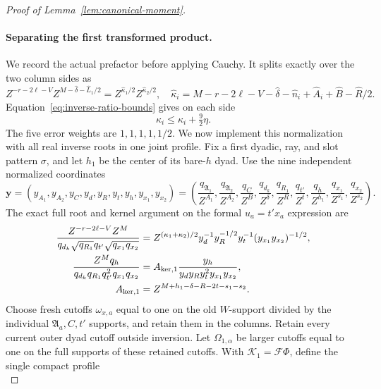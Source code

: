 \documentclass[11pt,a4paper]{article}
\numberwithin{equation}{section}
\numberwithin{figure}{section}
\theoremstyle{definition}
\theoremstyle{remark}
\begin{document}
\begin{proof}[Proof of Lemma~\ref{lem:canonical-moment}]
\paragraph{Separating the first transformed product.}
We record the actual prefactor before applying Cauchy.  It splits exactly
over the two column sides as
\[
 Z^{-r-2\ell-V}Z^{M-\widehat\delta-\widehat L_1/2}
       =Z^{\widehat\kappa_1/2}Z^{\widehat\kappa_2/2},
 \quad
 \widehat\kappa_i=M-r-2\ell-V-\widehat\delta-\widehat n_i
                  +\widehat A_i+\widehat B-\widehat R/2.
\]
Equation~\eqref{eq:inverse-ratio-bounds} gives on each side
\begin{equation}\label{eq:inverse-first-prefactor-error}
 \widehat\kappa_i\le\kappa_i+\tfrac92\eta.
\end{equation}
The five error weights are \(1,1,1,1,1/2\).  We now implement this
normalization with all real inverse roots in one joint profile.
Fix a first dyadic, ray, and slot pattern \(\sigma\), and let \(h_1\)
be the center of its bare-\(h\) dyad.  Use the nine independent
normalized coordinates
\[
 \boldsymbol y=(y_{A_1},y_{A_2},y_C,y_d,y_R,y_t,y_h,y_{x_1},y_{x_2})
 =\left(\frac{q_{\mathfrak A_1}}{Z^{A_1}},
 \frac{q_{\mathfrak A_2}}{Z^{A_2}},\frac{q_C}{Z^B},
 \frac{q_{d_k}}{Z^\delta},\frac{q_{R_1}}{Z^R},\frac{q_{t'}}{Z^t},
 \frac{q_h}{Z^{h_1}},\frac{q_{x_1}}{Z^{s_1}},\frac{q_{x_2}}{Z^{s_2}}\right).
\]
The exact full root and kernel argument on the formal \(u_a=t'x_a\)
expression are
\begin{equation}\label{eq:inverse-first-root-kernel}
 \begin{split}
 \frac{Z^{-r-2\ell-V}Z^M}
 {q_{d_k}\sqrt{q_{R_1}}q_{t'}\sqrt{q_{x_1}q_{x_2}}}
 &=Z^{(\kappa_1+\kappa_2)/2}
 y_d^{-1}y_R^{-1/2}y_t^{-1}(y_{x_1}y_{x_2})^{-1/2},\\
 \frac{Z^Mq_h}{q_{d_k}q_{R_1}q_{t'}^2q_{x_1}q_{x_2}}
 &=A_{{\rm ker},1}\frac{y_h}{y_dy_Ry_t^2y_{x_1}y_{x_2}},\\
 A_{{\rm ker},1}&=Z^{M+h_1-\delta-R-2t-s_1-s_2}.
 \end{split}
\end{equation}
Choose fresh cutoffs \(\omega_{x,a}\) equal to one on the old
\(W\)-support divided by the individual \(\mathfrak A_a,C,t'\)
supports, and retain them in the columns.  Retain every current outer
dyad cutoff outside inversion.  Let \(\Omega_{1,\alpha}\) be larger
cutoffs equal to one on the full supports of these retained cutoffs.
With \(\mathcal K_1=\mathcal F\Phi\), define the single compact profile
\begin{equation}\label{eq:inverse-first-profile}

\end{equation}
\end{proof}
\end{document}
